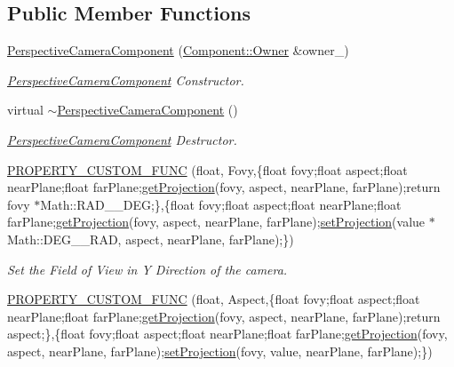 \subsection*{Public Member Functions}
\begin{DoxyCompactItemize}
\item 
\hyperlink{class_perspective_camera_component_a63c001a1398786823ee01bdf7bf38cb9}{Perspective\+Camera\+Component} (\hyperlink{class_magnum_1_1_component_1_1_owner}{Component\+::\+Owner} \&owner\+\_\+)
\begin{DoxyCompactList}\small\item\em \hyperlink{class_perspective_camera_component}{Perspective\+Camera\+Component} Constructor. \end{DoxyCompactList}\item 
virtual \hyperlink{class_perspective_camera_component_a7fb684b3fb2c9e3e19ee017acac84327}{$\sim$\+Perspective\+Camera\+Component} ()
\begin{DoxyCompactList}\small\item\em \hyperlink{class_perspective_camera_component}{Perspective\+Camera\+Component} Destructor. \end{DoxyCompactList}\item 
\hyperlink{class_perspective_camera_component_ac44ed3d640447f577336a14ead7f112e}{P\+R\+O\+P\+E\+R\+T\+Y\+\_\+\+C\+U\+S\+T\+O\+M\+\_\+\+F\+U\+NC} (float, Fovy,\{float fovy;float aspect;float near\+Plane;float far\+Plane;\hyperlink{class_perspective_camera_component_ae3ce00b7bbf1c9e9e073f28793dd1645}{get\+Projection}(fovy, aspect, near\+Plane, far\+Plane);return fovy $\ast$Math\+::\+R\+A\+D\+\_\+\_\+\+D\+EG;\},\{float fovy;float aspect;float near\+Plane;float far\+Plane;\hyperlink{class_perspective_camera_component_ae3ce00b7bbf1c9e9e073f28793dd1645}{get\+Projection}(fovy, aspect, near\+Plane, far\+Plane);\hyperlink{class_perspective_camera_component_a6b49a13999f7fb6593ca845c10579795}{set\+Projection}(value $\ast$Math\+::\+D\+E\+G\+\_\+\_\+\+R\+AD, aspect, near\+Plane, far\+Plane);\})
\begin{DoxyCompactList}\small\item\em Set the Field of View in Y Direction of the camera. \end{DoxyCompactList}\item 
\hyperlink{class_perspective_camera_component_a40144cd6095c0fb79f11325eaed5311b}{P\+R\+O\+P\+E\+R\+T\+Y\+\_\+\+C\+U\+S\+T\+O\+M\+\_\+\+F\+U\+NC} (float, Aspect,\{float fovy;float aspect;float near\+Plane;float far\+Plane;\hyperlink{class_perspective_camera_component_ae3ce00b7bbf1c9e9e073f28793dd1645}{get\+Projection}(fovy, aspect, near\+Plane, far\+Plane);return aspect;\},\{float fovy;float aspect;float near\+Plane;float far\+Plane;\hyperlink{class_perspective_camera_component_ae3ce00b7bbf1c9e9e073f28793dd1645}{get\+Projection}(fovy, aspect, near\+Plane, far\+Plane);\hyperlink{class_perspective_camera_component_a6b49a13999f7fb6593ca845c10579795}{set\+Projection}(fovy, value, near\+Plane, far\+Plane);\})

\end{DoxyCompactItemize}
